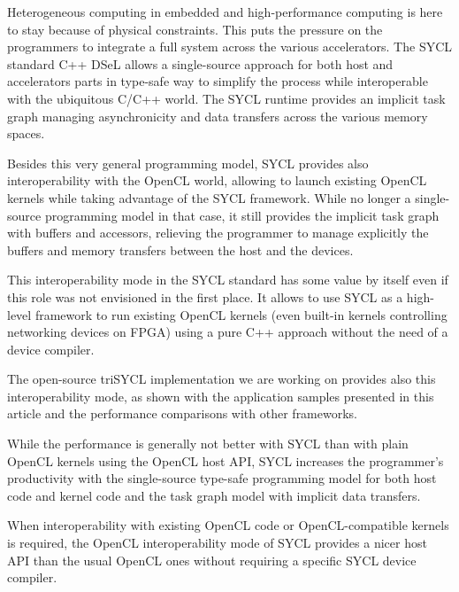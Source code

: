 \documentclass[sigplan]{acmart}
\begin{document}
Heterogeneous computing in embedded and high-performance computing is
here to stay because of physical constraints. This puts the pressure on
the programmers to integrate a full system across the various
accelerators. The SYCL standard C++ DSeL allows a single-source
approach for both host and accelerators parts in type-safe way to
simplify the process while interoperable with the ubiquitous C/C++
world. The SYCL runtime provides an implicit task graph managing
asynchronicity and data transfers across the various memory spaces.

Besides this very general programming model, SYCL provides also
interoperability with the OpenCL world, allowing to launch existing
OpenCL kernels while taking advantage of the SYCL framework. While no
longer a single-source programming model in that case, it still
provides the implicit task graph with buffers and accessors, relieving
the programmer to manage explicitly the buffers and memory transfers
between the host and the devices.

This interoperability mode in the SYCL standard has some value by
itself even if this role was not envisioned in the first place. It
allows to use SYCL as a high-level framework to run existing OpenCL
kernels (even built-in kernels controlling networking devices on
FPGA) using a pure C++ approach without the need of a device compiler.

The open-source triSYCL implementation \cite{triSYCL} we are working
on provides also this interoperability mode, as shown with the
application samples presented in this article and the performance
comparisons with other frameworks.

While the performance is generally not better with SYCL than with
plain OpenCL kernels using the OpenCL host API, SYCL increases the
programmer's productivity with the single-source type-safe programming
model for both host code and kernel code and the task graph model with
implicit data transfers.

When interoperability with existing OpenCL code or OpenCL-compatible
kernels is required, the OpenCL interoperability mode of SYCL provides
a nicer host API than the usual OpenCL ones without requiring a
specific SYCL device compiler.




\end{document}
